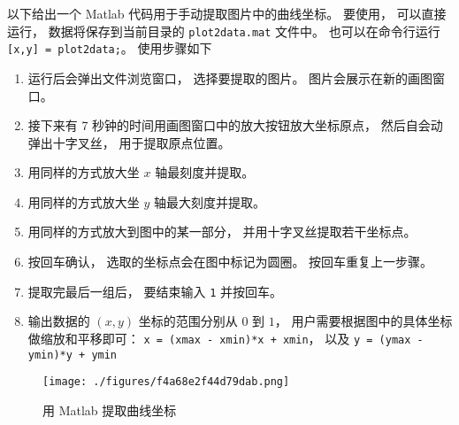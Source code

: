 

以下给出一个 Matlab 代码用于手动提取图片中的曲线坐标。 要使用， 可以直接运行， 数据将保存到当前目录的 \verb|plot2data.mat| 文件中。 也可以在命令行运行 \verb|[x,y] = plot2data;|。 使用步骤如下

\begin{enumerate}
\item 运行后会弹出文件浏览窗口， 选择要提取的图片。 图片会展示在新的画图窗口。
\item 接下来有 7 秒钟的时间用画图窗口中的放大按钮放大坐标原点， 然后自会动弹出十字叉丝， 用于提取原点位置。
\item 用同样的方式放大坐 $x$ 轴最刻度并提取。
\item 用同样的方式放大坐 $y$ 轴最大刻度并提取。
\item 用同样的方式放大到图中的某一部分， 并用十字叉丝提取若干坐标点。
\item 按回车确认， 选取的坐标点会在图中标记为圆圈。 按回车重复上一步骤。
\item 提取完最后一组后， 要结束输入 \verb|1| 并按回车。
\item 输出数据的 $(x, y)$ 坐标的范围分别从 $0$ 到 $1$， 用户需要根据图中的具体坐标做缩放和平移即可： \verb|x = (xmax - xmin)*x + xmin|， 以及 \verb|y = (ymax - ymin)*y + ymin|
\end{enumerate}

\begin{figure}[ht]
\centering
\texttt{[image: ./figures/f4a68e2f44d79dab.png]}
\caption{用 Matlab 提取曲线坐标} \label{fig_plt2xy_1}
\end{figure}

\begin{lstlisting}[language=matlab, caption=plot2data.m]

\end{lstlisting}
